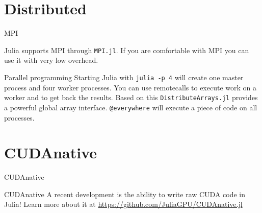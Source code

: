 \documentclass{beamer}
\begin{document}
\section{Distributed}
\begin{frame}{MPI}
  \begin{block}{}
    Julia supports MPI through \lstinline{MPI.jl}. If you are comfortable with MPI you can use it with very low overhead.
  \end{block}
\end{frame}
\begin{frame}{Parallel programming}
  Starting Julia with \lstinline{julia -p 4} will create one master process and four worker processes. You can use remotecalls to execute work on a worker and to get back the results. Based on this \lstinline{DistributeArrays.jl} provides a powerful global array interface.
  \lstinline{@everywhere} will execute a piece of code on all processes.
\end{frame}
\section{CUDAnative}
\begin{frame}{CUDAnative}
  \begin{block}{CUDAnative}
    A recent development is the ability to write raw CUDA code in Julia! Learn more about it at \url{https://github.com/JuliaGPU/CUDAnative.jl}
  \end{block}
\end{frame}
\end{document}
